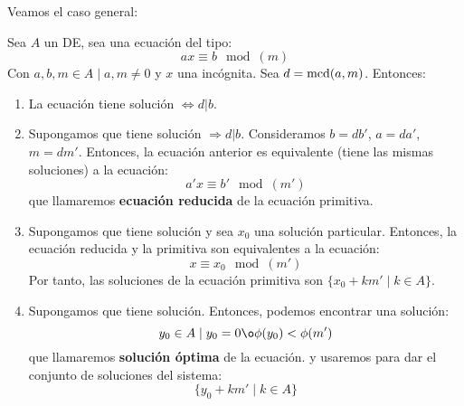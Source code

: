 Veamos el caso general:
\begin{teo}
    \label{teo:ecCongruencia}
    Sea $A$ un DE, sea una ecuación del tipo:
    $$ax\equiv b\mod(m)$$
    Con $a,b,m \in A \mid a,m \neq 0$ y $x$ una incógnita. Sea $d = \operatorname{mcd}(a,m)$. Entonces:
    \begin{enumerate}
        \item La ecuación tiene solución $\Longleftrightarrow d|b$.
        \item Supongamos que tiene solución $\Longrightarrow d|b$. Consideramos $b=db'$, $a=da'$, $m=dm'$. Entonces, la ecuación anterior es equivalente (tiene las mismas soluciones) a la ecuación:
        $$a'x\equiv b'\mod(m')$$
        que llamaremos \textbf{ecuación reducida} de la ecuación primitiva.

        \item Supongamos que tiene solución y sea $x_0$ una solución particular. Entonces, la ecuación reducida y la primitiva son equivalentes a la ecuación:
        $$x\equiv x_0\mod(m')$$
        Por tanto, las soluciones de la ecuación primitiva son $\{x_0 + km' \mid k \in A\}$.

        \item Supongamos que tiene solución. Entonces, podemos encontrar una solución: $$y_0 \in A \mid y_0=0 \o \phi(y_0) < \phi(m')$$ que llamaremos \textbf{solución óptima} de la ecuación. y usaremos para dar el conjunto de soluciones del sistema:
        $$\{y_0 + km' \mid k \in A\}$$
    \end{enumerate}
\end{teo}
